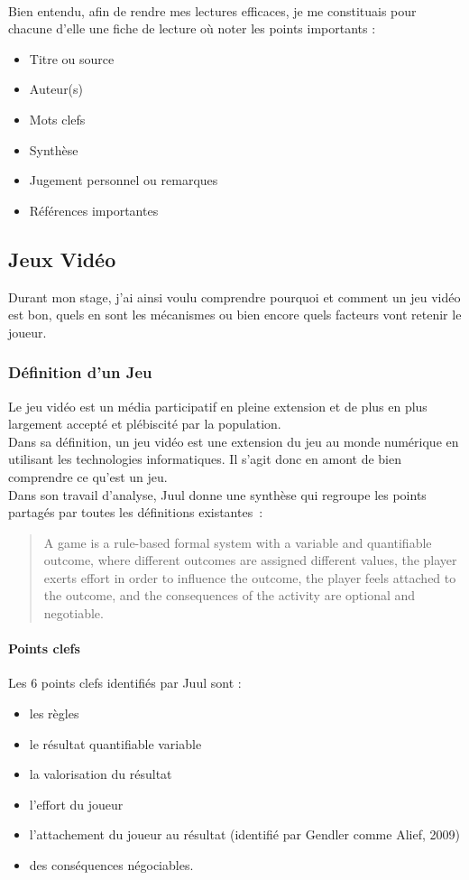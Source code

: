 	\paragraph{}Bien entendu, afin de rendre mes lectures efficaces, je me constituais pour chacune d'elle une fiche de lecture où noter les points importants : 
\begin{itemize}
	\item Titre ou source
	\item Auteur(s)
	\item Mots clefs
	\item Synthèse
	\item Jugement personnel ou remarques
	\item Références importantes
\end{itemize}

\subsection{Jeux Vidéo}
Durant mon stage, j'ai ainsi voulu comprendre pourquoi et comment un jeu vidéo est bon, quels en sont les mécanismes ou bien encore quels facteurs vont retenir le joueur. 
	\subsubsection{Définition d'un Jeu}
Le jeu vidéo est un média participatif en pleine extension et de plus en plus largement accepté et plébiscité par la population. \\Dans sa définition, un jeu vidéo est une extension du jeu au monde numérique en utilisant les technologies informatiques. Il s'agit donc en amont de bien comprendre ce qu'est un jeu. \\Dans son travail d’analyse, Juul\cite{Juul05} donne une synthèse qui regroupe les points partagés par toutes les définitions existantes~:
\begin{quotation}
A game is a rule-based formal system with a variable and quantifiable outcome, where different outcomes are assigned different values, the player exerts effort in order to influence the outcome, the player feels attached to the outcome, and the consequences of the activity are optional and negotiable. 
\end{quotation}
\paragraph{Points clefs \\}
Les 6 points clefs identifiés par Juul sont :
\begin{itemize}
	\item les règles
	\item le résultat quantifiable variable
	\item la valorisation du résultat
	\item l’effort du joueur
	\item l’attachement du joueur au résultat (identifié par Gendler comme Alief, 2009)
	\item des conséquences négociables.
\end{itemize}

